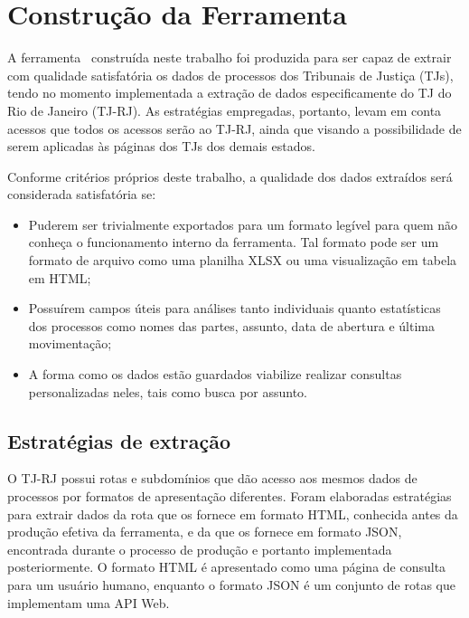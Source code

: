\chapter{Construção da Ferramenta \tjscraper~\label{chp:construção-da-ferramenta}}

A ferramenta \tjscraper~construída neste trabalho foi produzida para ser capaz
de extrair com qualidade satisfatória os dados de processos dos Tribunais de
Justiça (TJs), tendo no momento implementada a extração de dados
especificamente do TJ do Rio de Janeiro (TJ-RJ). As estratégias empregadas,
portanto, levam em conta acessos que todos os acessos serão ao TJ-RJ, ainda que
visando a possibilidade de serem aplicadas às páginas dos TJs dos demais
estados.

Conforme critérios próprios deste trabalho, a qualidade dos dados extraídos
será considerada satisfatória se:

\begin{itemize}
    \item Puderem ser trivialmente exportados para um formato legível para quem
        não conheça o funcionamento interno da ferramenta. Tal formato pode ser
        um formato de arquivo como uma planilha XLSX ou uma visualização em
        tabela em HTML;
    \item Possuírem campos úteis para análises tanto individuais quanto
        estatísticas dos processos como nomes das partes, assunto, data de
        abertura e última movimentação;
    \item A forma como os dados estão guardados viabilize realizar consultas
        personalizadas neles, tais como busca por assunto.
\end{itemize}

\section{Estratégias de extração}

O TJ-RJ possui rotas e subdomínios que dão acesso aos mesmos dados de processos
por formatos de apresentação diferentes. Foram elaboradas estratégias para
extrair dados da rota que os fornece em formato HTML, conhecida antes da
produção efetiva da ferramenta, e da que os fornece em formato JSON, encontrada
durante o processo de produção e portanto implementada posteriormente. O
formato HTML é apresentado como uma página de consulta para um usuário humano,
enquanto o formato JSON é um conjunto de rotas que implementam uma API Web.

